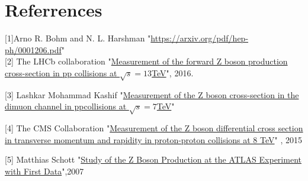 \documentclass{article}		%
\begin{document}
\section{Referrences}

  [1]Arno R. Bohm and N. L. Harshman
"\href{https://arxiv.org/pdf/hep-ph/0001206.pdf}{https://arxiv.org/pdf/hep-ph/0001206.pdf}" \\


[2] The LHCb collaboration "\href{https://arxiv.org/pdf/1607.06495.pdf}{Measurement of the forward Z boson production cross-section in pp collisions at $\sqrt{s} = 13$TeV}", 2016.


[3] Lashkar Mohammad Kashif "\href{http://lppc.physics.harvard.edu/files/lppc/files/kashif-2.pdf} {Measurement of the Z boson cross-section in the
	dimuon channel in ppcollisions at $\sqrt{s}= 7 $TeV}"

[4] The CMS Collaboration "\href{https://arxiv.org/pdf/1504.03511.pdf}{Measurement of the Z boson differential cross section in
	transverse momentum and rapidity in proton-proton
	collisions at 8 TeV}" , 2015

[5] Matthias Schott "\href{https://cds.cern.ch/record/2069156/files/Schott_Matthias.pdf}{Study of the Z Boson Production at the ATLAS Experiment with First Data}",2007




	
	
    
     
		
 

 
\end{document}
